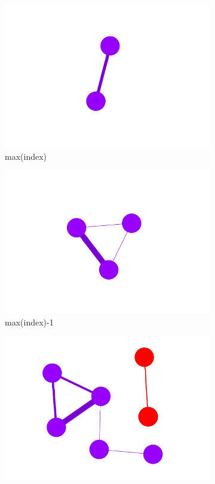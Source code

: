\begin{figure}[!htb]
	\centering
	\begin{subfigure}[b]{0.15\linewidth}
		\includegraphics[width=\linewidth]{Minor Thesis/figures/graphs/nn/A.png}
		\caption{max(index)}
	\end{subfigure}
	\hfill
	\begin{subfigure}[b]{0.15\linewidth}
		\includegraphics[width=\linewidth]{Minor Thesis/figures/graphs/nn/B.png}
		\caption{max(index)-1}
	\end{subfigure}
	\hfill
	\begin{subfigure}[b]{0.15\linewidth}
		\includegraphics[width=\linewidth]{Minor Thesis/figures/graphs/nn/C.png}

\end{subfigure}
\end{figure}
